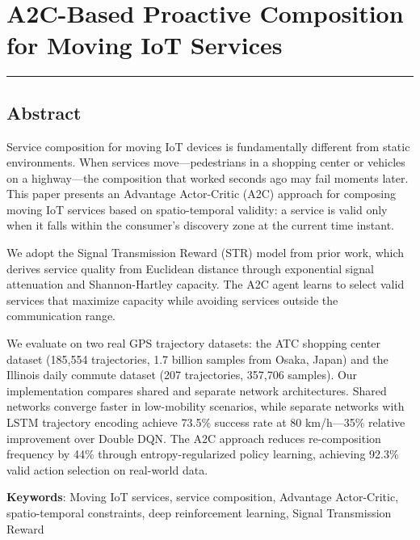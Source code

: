 \documentclass[
  10pt,
  twocolumn,
]{article}
\author{}
\date{}
\begin{document}
\hypertarget{a2c-based-proactive-composition-for-moving-iot-services}{%
	\section{A2C-Based Proactive Composition for Moving IoT
	  Services}\label{a2c-based-proactive-composition-for-moving-iot-services}}

\begin{center}\rule{0.5\linewidth}{0.5pt}\end{center}

\hypertarget{abstract}{%
	\subsection{Abstract}\label{abstract}}

Service composition for moving IoT devices is fundamentally different
from static environments. When services move---pedestrians in a shopping
center or vehicles on a highway---the composition that worked seconds
ago may fail moments later. This paper presents an Advantage
Actor-Critic (A2C) approach for composing moving IoT services based on
spatio-temporal validity: a service is valid only when it falls within
the consumer's discovery zone at the current time instant.

We adopt the Signal Transmission Reward (STR) model from prior work,
which derives service quality from Euclidean distance through
exponential signal attenuation and Shannon-Hartley capacity. The A2C
agent learns to select valid services that maximize capacity while
avoiding services outside the communication range.

We evaluate on two real GPS trajectory datasets: the ATC shopping center
dataset (185,554 trajectories, 1.7 billion samples from Osaka, Japan)
and the Illinois daily commute dataset (207 trajectories, 357,706
samples). Our implementation compares shared and separate network
architectures. Shared networks converge faster in low-mobility
scenarios, while separate networks with LSTM trajectory encoding achieve
73.5\% success rate at 80 km/h---35\% relative improvement over Double
DQN. The A2C approach reduces re-composition frequency by 44\% through
entropy-regularized policy learning, achieving 92.3\% valid action
selection on real-world data.

\textbf{Keywords}: Moving IoT services, service composition, Advantage
Actor-Critic, spatio-temporal constraints, deep reinforcement learning,
Signal Transmission Reward
\end{document}
